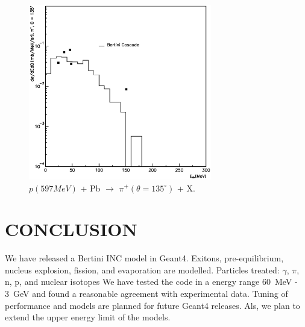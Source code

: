 \documentclass[twocolumn,twoside,slac]{revtex4}
\begin{document}
\begin{figure}
  \includegraphics[width=80mm,keepaspectratio]{pn_pb_597_pip_a4.eps}
  \caption{$p(597 MeV)$ + Pb $\rightarrow$ $\pi^{+}(\theta = 135^{\circ})$ + X.}
  \label{pi135}
\end{figure}


\section{CONCLUSION}
We have released a Bertini INC model in Geant4.
Exitons, pre-equilibrium, nucleus explosion, fission, and evaporation are modelled.
Particles treated: $\gamma$, $\pi$, n, p, and nuclear isotopes 
We have tested the code in a energy range 60~MeV - 3~GeV and found a reasonable agreement with
experimental data. Tuning of performance and models are planned for future Geant4 releases.
Als, we plan to extend the upper energy limit of the models.

 




%
%

\end{document}
